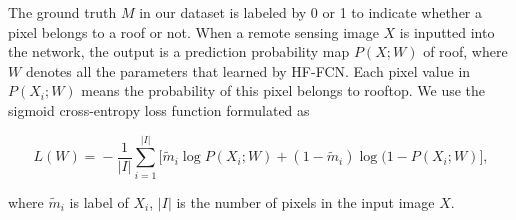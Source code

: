 The ground truth $M$ in our dataset is labeled by 0 or 1 to indicate whether a pixel belongs to a roof or not. 
When a remote sensing image ${X}$ is inputted into the network, the output is a prediction probability map $P(X;W)$ of roof, where $W$ denotes all the parameters that learned by HF-FCN. Each pixel value in $P(X_{i};W)$ means the probability of this pixel belongs to rooftop.
We use the sigmoid cross-entropy loss function formulated as
\begin{small}
\begin{equation}
     \label{loss}
     \ L(W)\! =\! -\frac{1}{\vert I\vert}\sum_{i=1}^{\vert I \vert}\lbrack{\tilde{m}_i \log{P(X_{i};W)}\!+\!(1\!-\!\tilde{m}_i)\log(1\!-\!P(X_{i};W)}\rbrack,
\end{equation}
\end{small}
where $\tilde{m}_i$ is label of $X_{i}$, ${\vert I\vert}$ is the number of pixels in the input image ${X}$.
